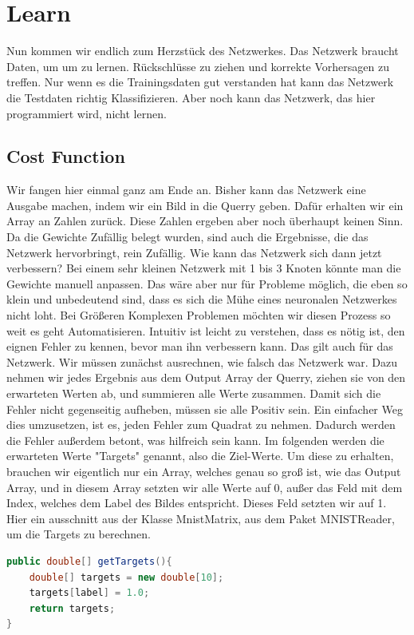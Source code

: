 \documentclass[12pt]{article}
\begin{document}
\section{Learn}Nun kommen wir endlich zum Herzstück des Netzwerkes. Das Netzwerk braucht Daten, um um zu lernen. Rückschlüsse zu ziehen und korrekte Vorhersagen zu treffen. Nur wenn es die Trainingsdaten gut verstanden hat kann das Netzwerk die Testdaten richtig Klassifizieren. Aber noch kann das Netzwerk, das hier programmiert wird, nicht lernen.
\subsection{Cost Function}Wir fangen hier einmal ganz am Ende an. Bisher kann das Netzwerk eine Ausgabe machen, indem wir ein Bild in die Querry geben. Dafür erhalten wir ein Array an Zahlen zurück. Diese Zahlen ergeben aber noch überhaupt keinen Sinn. Da die Gewichte Zufällig belegt wurden, sind auch die Ergebnisse, die das Netzwerk hervorbringt, rein Zufällig. 
Wie kann das Netzwerk sich dann jetzt verbessern? Bei einem sehr kleinen Netzwerk mit 1 bis 3 Knoten könnte man die Gewichte manuell anpassen. Das wäre aber nur für Probleme möglich, die eben so klein und unbedeutend sind, dass es sich die Mühe eines neuronalen Netzwerkes nicht loht. Bei Größeren Komplexen Problemen möchten wir diesen Prozess so weit es geht Automatisieren.
Intuitiv ist leicht zu verstehen, dass es nötig ist, den eignen Fehler zu kennen, bevor man ihn verbessern kann. Das gilt auch für das Netzwerk. Wir müssen zunächst ausrechnen, wie falsch das Netzwerk war. Dazu nehmen wir jedes Ergebnis aus dem Output Array der Querry, ziehen sie von den erwarteten Werten ab, und summieren alle Werte zusammen. Damit sich die Fehler nicht gegenseitig aufheben, müssen sie alle Positiv sein. Ein einfacher Weg dies umzusetzen, ist es, jeden Fehler zum Quadrat zu nehmen. Dadurch werden die Fehler außerdem betont, was hilfreich sein kann. Im folgenden werden die erwarteten Werte "Targets" genannt, also die Ziel-Werte. Um diese zu erhalten, brauchen wir eigentlich nur ein Array, welches genau so groß ist, wie das Output Array, und in diesem Array setzten wir alle Werte auf 0, außer das Feld mit dem Index, welches dem Label des Bildes entspricht. Dieses Feld setzten wir auf 1. Hier ein ausschnitt aus der Klasse MnistMatrix, aus dem Paket MNISTReader, um die Targets zu berechnen.
\begin{lstlisting}[language=Java]
public double[] getTargets(){
    double[] targets = new double[10];
    targets[label] = 1.0;
    return targets;
} 
\end{lstlisting}
\end{document}
